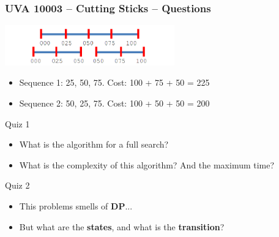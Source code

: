 \begin{frame}
  \frametitle{UVA 10003 -- Cutting Sticks -- Questions}

  {\smaller
    \begin{center}
      \includegraphics[width=0.55\textwidth]{../img/cuttingsticks}
      \begin{itemize}
      \item Sequence 1: 25, 50, 75. Cost: 100 + 75 + 50 = 225
      \item Sequence 2: 50, 25, 75. Cost: 100 + 50 + 50 = 200
      \end{itemize}
    \end{center}

    \begin{exampleblock}{Quiz 1}
      \begin{itemize}
      \item What is the algorithm for a full search?
      \item What is the complexity of this algorithm? And the maximum time?
      \end{itemize}
    \end{exampleblock}

    \begin{exampleblock}{Quiz 2}
      \begin{itemize}
      \item This problems smells of {\bf DP}...
      \item But what are the {\bf states}, and what is the {\bf transition}?
      \end{itemize}
    \end{exampleblock}

  }
\end{frame}

